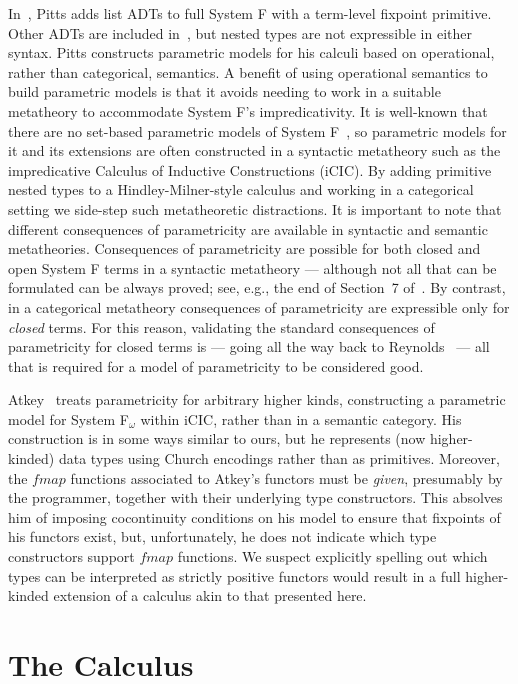\documentclass{lmcs}
\theoremstyle{plain}\newtheorem{satz}[thm]{Satz}
\begin{document}
{In~\cite{pit00}, Pitts adds list ADTs to full System F with a
term-level fixpoint primitive. Other ADTs are included
in~\cite{pit98}, but nested types are not expressible in either
syntax. Pitts constructs parametric models for his calculi based on
operational, rather than categorical, semantics. A benefit of using
operational semantics to build parametric models is that it avoids
needing to work in a suitable metatheory to accommodate System F's
impredicativity. It is well-known that there are no set-based
parametric models of System F~\cite{rey84}, so parametric models for
it and its extensions are often constructed in a syntactic metatheory
such as the impredicative Calculus of Inductive Constructions (iCIC).
By adding primitive nested types to a Hindley-Milner-style calculus
and working in a categorical setting we side-step such metatheoretic
distractions. It is important to note that different consequences of
parametricity are available in syntactic and semantic
metatheories. Consequences of parametricity are possible for both
closed and open System F terms in a syntactic metatheory --- although
not all that can be formulated can be always proved; see, e.g., the
end of Section~7 of~\cite{bm98}. By contrast, in a categorical
metatheory consequences of parametricity are expressible only for {\em
  closed} terms. For this reason, validating the standard consequences
of parametricity for closed terms is --- going all the way back to
Reynolds~\cite{rey83} --- all that is required for a model of
parametricity to be considered good.

Atkey~\cite{atk12} treats parametricity for arbitrary higher kinds,
constructing a parametric model for System F$_\omega$ within iCIC,
rather than in a semantic category. His construction is in some ways
similar to ours, but he represents (now higher-kinded) data types
using Church encodings rather than as primitives. Moreover, the
$\mathit{fmap}$ functions associated to Atkey's functors must be {\em
  given}, presumably by the programmer, together with their underlying
type constructors. This absolves him of imposing cocontinuity
conditions on his model to ensure that fixpoints of his functors
exist, but, unfortunately, he does not indicate which type
constructors support $\mathit{fmap}$ functions. We suspect explicitly
spelling out which types can be interpreted as strictly positive
functors would result in a full higher-kinded extension of a calculus
akin to that presented here.

\section{The Calculus}\label{sec:calculus}

}
\end{document}
